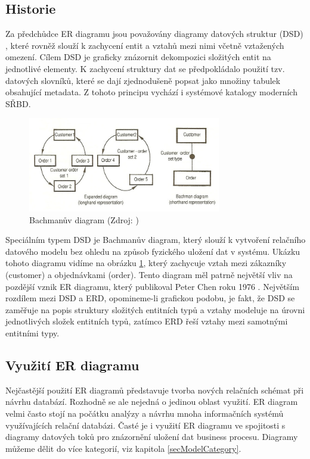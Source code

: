 \documentclass[czech,bachelor,public,dept460,male,oneside]{diploma}
\begin{document}
	\subsection{Historie}
	Za předchůdce ER diagramu jsou považovány diagramy datových struktur (DSD) \cite{bachmanDsd}, které rovněž slouží k zachycení entit a vztahů mezi nimi včetně vztažených omezení. Cílem DSD je graficky znázornit dekompozici složitých entit na jednotlivé elementy. K zachycení struktury dat se předpokládalo použití tzv. datových slovníků, které se dají zjednodušeně popsat jako množiny tabulek obsahující metadata. Z tohoto principu vychází i systémové katalogy moderních SŘBD.
	
	\begin{figure}[!h]
		\centering
		\includegraphics[width=0.75\textwidth]{Figures/BachmanDiagram}
		\caption[Bachmanův diagram]{Bachmanův diagram (Zdroj: \cite{wikiDsd})}
		\label{fig:bachmanDiag}
	\end{figure}
	
	Speciálním typem DSD je Bachmanův diagram, který slouží k vytvoření relačního datového modelu bez ohledu na způsob fyzického uložení dat v systému. Ukázku tohoto diagramu vidíme na obrázku \ref{fig:bachmanDiag}, který zachycuje vztah mezi zákazníky (customer) a objednávkami (order). Tento diagram měl patrně největší vliv na pozdější vznik ER diagramu, který publikoval Peter Chen roku 1976 \cite{chenERD}.
	Největším rozdílem mezi DSD a ERD, opomineme-li grafickou podobu, je fakt, že DSD se zaměřuje na popis struktury složitých entitních typů a vztahy modeluje na úrovni jednotlivých složek entitních typů, zatímco ERD řeší vztahy mezi samotnými entitními typy. 
		
	\subsection{Využití ER diagramu}
	Nejčastější použití ER diagramů představuje tvorba nových relačních schémat při návrhu databází. Rozhodně se ale nejedná o jedinou oblast využití. ER diagram velmi často stojí na počátku analýzy a návrhu mnoha informačních systémů využívajících relační databázi. Časté je i využití ER diagramu ve spojitosti s diagramy datových toků pro znázornění uložení dat business procesu. Diagramy můžeme dělit do více kategorií, viz kapitola \ref{secModelCategory}.
	
\end{document}
